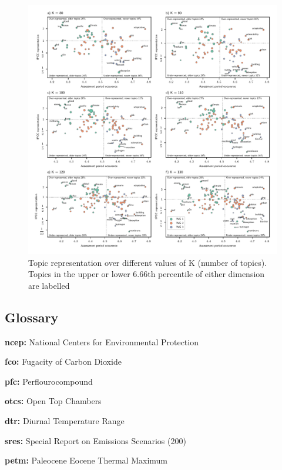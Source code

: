 \documentclass{article}
\begin{document}
\begin{linenumbers}
\begin{figure}
	\begin{center}
		\includegraphics[width=1\linewidth]{plots_pub/topic_rep_ks.pdf}
		\caption{Topic representation over different values of K (number of topics). Topics in the upper or lower 6.66th percentile of either dimension are labelled}
		\label{top-rep-ks}
	\end{center}
\end{figure}

\subsection*{Glossary}


\noindent\textbf{ncep:} National Centers for Environmental Protection

\noindent\textbf{fco:} Fugacity of Carbon Dioxide

\noindent\textbf{pfc:} Perflourocompound

\noindent\textbf{otcs:} Open Top Chambers

\noindent\textbf{dtr:} Diurnal Temperature Range

\noindent\textbf{sres:} Special Report on Emissions Scenarios (200)

\noindent\textbf{petm:} Paleocene Eocene Thermal Maximum


\end{linenumbers}
\end{document}
